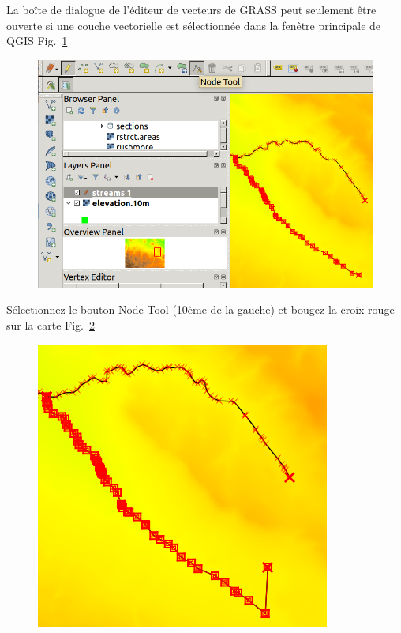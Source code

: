 La bo\^ite de dialogue de l'\'editeur de vecteurs de GRASS peut seulement \^etre ouverte si une couche vectorielle est s\'electionn\'ee dans la fen\^etre principale de QGIS Fig.~\ref{fig:qgis025}

\begin{figure}[htbp]
   \centering
   \includegraphics[scale=0.3]{qgis025.png}
   \caption{}
   \label{fig:qgis025}
\end{figure}

S\'electionnez le bouton Node Tool (10\`eme de la gauche) et bougez la croix rouge sur la carte Fig.~\ref{fig:qgis026}

\begin{figure}[htbp]
   \centering
   \includegraphics[scale=0.3]{qgis026.png}
   \caption{}
   \label{fig:qgis026}
\end{figure}

